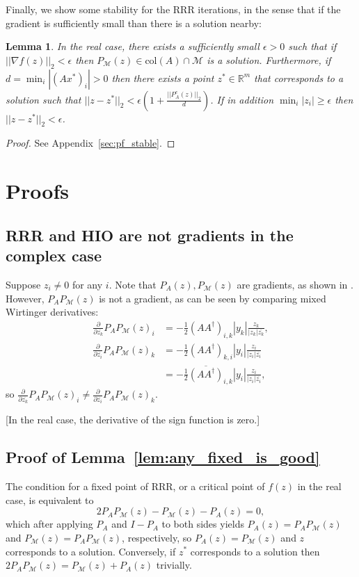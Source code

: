 \documentclass[journal]{IEEEtran}
\newtheorem{lemma}{Lemma}
\theoremstyle{definition}
\theoremstyle{remark}
\theoremstyle{definition}
\theoremstyle{problem}
\theoremstyle{definition}
\newcommand{\blem}{\begin{lemma}}
\newcommand{\elem}{\end{lemma}}
\newcommand{\bpof}{\begin{proof}}
\newcommand{\epof}{\end{proof}}
\newcommand{\col}{\text{col}}
\newcommand{\RR}{\mathbb{R} }
\newcommand{\MM}{\mathcal{M}}
\begin{document}
Finally, we show some stability for the RRR iterations, in the sense that if the gradient is sufficiently small than there is a solution nearby:
\blem\label{lem:stable} In the real case, there exists a sufficiently small $\epsilon>0$ such that if $||\nabla f(z)||_2< \epsilon$ then $P_{\MM}(z)\in\col(A)\cap\MM$ is a solution. Furthermore, if $d=\min_i|(Ax^*)_i|>0$ then there exists a point $z^*\in\RR^m$ that corresponds to a solution such that $||z-z^*||_2<\epsilon\left(1 + \frac{||P_A^c(z)||_2}{d}\right)$. If in addition $\min_i|z_i|\geq\epsilon$ then $||z-z^*||_2< \epsilon$.\elem
\bpof See Appendix~\ref{sec:pf_stable}. \epof

\section{Proofs}

\subsection{RRR and HIO are not gradients in the complex case}\label{sec:complex_not_grads}

Suppose $z_i\neq 0$ for any $i$. Note that $P_A(z),P_{\MM}(z)$ are gradients, as shown in \cite{Marchesini2007}. However, $P_AP_{\MM}(z)$ is not a gradient, as can be seen by comparing mixed Wirtinger derivatives:
\[\begin{aligned} \frac{\partial}{\partial \overline{z_k}}P_AP_{\MM}(z)_i &= -\frac{1}{2}(AA^{\dagger})_{i,k}|y_k|\frac{z_k}{|z_k|\overline{z_k}},\\
\frac{\partial}{\partial \overline{z_i}}P_AP_{\MM}(z)_k &= -\frac{1}{2}(AA^{\dagger})_{k,i}|y_i|\frac{z_i}{|z_i|\overline{z_i}} \\&= -\frac{1}{2}\overline{(AA^{\dagger})}_{i,k}|y_i|\frac{z_i}{|z_i|\overline{z_i}},\end{aligned}\]
so $\frac{\partial}{\partial \overline{z_k}}P_AP_{\MM}(z)_i\neq \frac{\partial}{\partial \overline{z_i}}P_AP_{\MM}(z)_k$. 

[In the real case, the derivative of the sign function is zero.]

\subsection{Proof of Lemma~\ref{lem:any_fixed_is_good}}\label{sec:pf_any_fixed_good}

The condition for a fixed point of RRR, or a critical point of $f(z)$ in the real case, is equivalent to
\[ 2P_AP_{\MM}(z) - P_{\MM}(z) - P_A(z) = 0,\]
which after applying $P_A$ and $I-P_A$ to both sides yields $P_A(z) = P_AP_{\MM}(z)$ and $P_{\MM}(z) = P_AP_{\MM}(z)$, respectively, so $P_A(z)=P_{\MM}(z)$ and $z$ corresponds to a solution. Conversely, if $z^*$ corresponds to a solution then $2P_AP_{\MM}(z) = P_{\MM}(z) + P_A(z)$ trivially.
\end{document}
